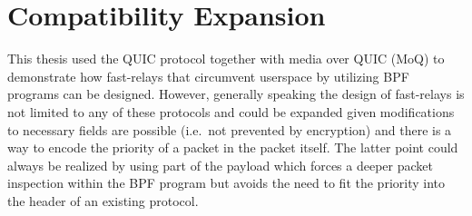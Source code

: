 \section{Compatibility Expansion}\label{sec:compatibility_expansion}
This thesis used the QUIC protocol together with media over QUIC (MoQ)
to demonstrate how fast-relays that circumvent userspace by utilizing
BPF programs can be designed.
However, generally speaking the design of fast-relays is not limited to
any of these protocols and could be expanded given modifications to 
necessary fields are possible (i.e.~not prevented by encryption) and
there is a way to encode the priority of a packet in the packet itself.
The latter point could always be realized by using part of the payload
which forces a deeper packet inspection within the BPF program but 
avoids the need to fit the priority into the header of an existing 
protocol.